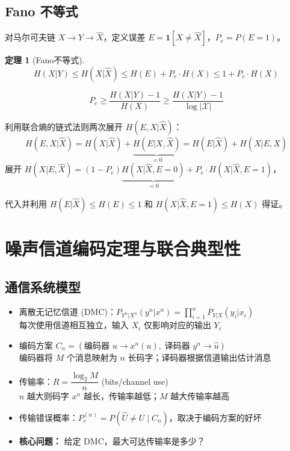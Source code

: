 \documentclass[12pt,a4paper]{ctexart}
\newtheorem{theorem}{定理}[section]
\theoremstyle{definition}
\newcommand{\XX}{\mathcal{X}}
\begin{document}
\subsection{Fano 不等式}

对马尔可夫链 $X \to Y \to \hat{X}$，定义误差 $E = \mathbf{1}[X \neq \hat{X}]$，$P_e = P(E=1)$。

\begin{theorem}[Fano不等式]
\[
H(X|Y) \leq H(X|\hat{X}) \leq H(E) + P_e \cdot H(X) \leq 1 + P_e \cdot H(X)
\]
\end{theorem}

\begin{keybox}
\[
P_e \geq \frac{H(X|Y) - 1}{H(X)} \geq \frac{H(X|Y) - 1}{\log|\XX|}
\]
\end{keybox}

\begin{proofbox}[Fano不等式证明]
利用联合熵的链式法则两次展开 $H(E,X|\hat{X})$：
\[
H(E,X|\hat{X}) = H(X|\hat{X}) + \underbrace{H(E|X,\hat{X})}_{=0}
= H(E|\hat{X}) + H(X|E,\hat{X})
\]
展开 $H(X|E,\hat{X}) = (1-P_e)\underbrace{H(X|\hat{X},E=0)}_{=0} + P_e \cdot H(X|\hat{X},E=1)$，

代入并利用 $H(E|\hat{X}) \leq H(E) \leq 1$ 和 $H(X|\hat{X},E=1) \leq H(X)$ 得证。
\end{proofbox}

\section{噪声信道编码定理与联合典型性}


\subsection{通信系统模型}

\begin{itemize}[nosep]
  \item 离散无记忆信道 (DMC)：$P_{Y^n|X^n}(y^n|x^n) = \prod_{i=1}^n P_{Y|X}(y_i|x_i)$ \\
  每次使用信道相互独立，输入 $X_i$ 仅影响对应的输出 $Y_i$
  \item 编码方案 $C_n = (\text{编码器 } u \to x^n(u),\; \text{译码器 } y^n \to \hat{u})$ \\
  编码器将 $M$ 个消息映射为 $n$ 长码字；译码器根据信道输出估计消息
  \item 传输率：$R = \dfrac{\log_2 M}{n}$ (bits/channel use) \\
  $n$ 越大则码字 $x^n$ 越长，传输率越低；$M$ 越大传输率越高
  \item 传输错误概率：$P_e^{(n)} = P(\hat{U} \neq U \mid C_n)$，取决于编码方案的好坏
  \item \textbf{核心问题：} 给定 DMC，最大可达传输率是多少？
\end{itemize}
\end{document}
